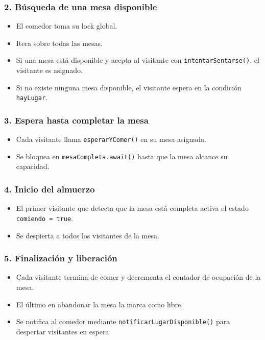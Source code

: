 \documentclass[12pt,a4paper]{article}
\begin{document}
\subsubsection*{2. Búsqueda de una mesa disponible}
\begin{itemize}
    \item El comedor toma su lock global.
    \item Itera sobre todas las mesas.
    \item Si una mesa está disponible y acepta al visitante con \texttt{intentarSentarse()}, el visitante es asignado.
    \item Si no existe ninguna mesa disponible, el visitante espera en la condición \texttt{hayLugar}.
\end{itemize}

\subsubsection*{3. Espera hasta completar la mesa}
\begin{itemize}
    \item Cada visitante llama \texttt{esperarYComer()} en su mesa asignada.
    \item Se bloquea en \texttt{mesaCompleta.await()} hasta que la mesa alcance su capacidad.
\end{itemize}

\subsubsection*{4. Inicio del almuerzo}
\begin{itemize}
    \item El primer visitante que detecta que la mesa está completa activa el estado \texttt{comiendo = true}.
    \item Se despierta a todos los visitantes de la mesa.
\end{itemize}

\subsubsection*{5. Finalización y liberación}
\begin{itemize}
    \item Cada visitante termina de comer y decrementa el contador de ocupación de la mesa.
    \item El último en abandonar la mesa la marca como libre.
    \item Se notifica al comedor mediante \texttt{notificarLugarDisponible()} para despertar visitantes en espera.
\end{itemize}
\end{document}
